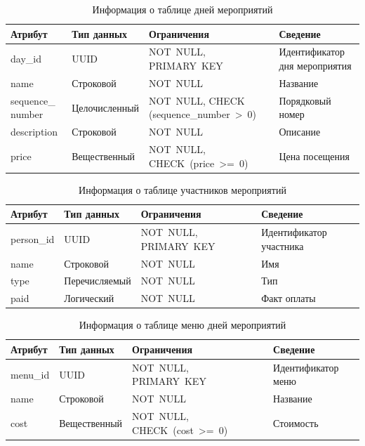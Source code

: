 \begin{table}[h!]
	\centering
	\caption{Информация о таблице дней мероприятий}
	\begin{tabularx}{\textwidth}{|p{2.6cm}|X|p{6cm}|X|}
		\hline
		\textbf{Атрибут} & \textbf{Тип данных} & \textbf{Ограничения} & \textbf{Сведение} \\
		\hline
		day\_id & UUID & NOT~NULL, \newline PRIMARY~KEY & Идентификатор дня мероприятия \\
		\hline
		name & Строковой & NOT~NULL & Название \\
		\hline
		sequence\_ number & Целочисленный & NOT~NULL, \newline CHECK (sequence\_number~>~0) & Порядковый номер \\
		\hline
		description & Строковой & NOT~NULL & Описание \\
		\hline
		price & Вещественный & NOT~NULL, \newline CHECK~(price~>=~0) & Цена посещения \\
		\hline
	\end{tabularx}
	\label{tbl:days}
\end{table}

\begin{table}[h!]
	\centering
	\caption{Информация о таблице участников мероприятий}
	\begin{tabularx}{\textwidth}{|p{2.6cm}|X|p{6cm}|X|}
		\hline
		\textbf{Атрибут} & \textbf{Тип данных} & \textbf{Ограничения} & \textbf{Сведение} \\
		\hline
		person\_id & UUID & NOT~NULL, \newline PRIMARY~KEY & Идентификатор участника \\
		\hline
		name & Строковой & NOT~NULL & Имя \\
		\hline
		type & Перечисляемый & NOT~NULL & Тип \\
		\hline
		paid & Логический & NOT~NULL & Факт оплаты \\
		\hline
	\end{tabularx}
	\label{tbl:persons}
\end{table}

\begin{table}[h!]
	\centering
	\caption{Информация о таблице меню дней мероприятий}
	\begin{tabularx}{\textwidth}{|p{2.6cm}|X|p{6cm}|X|}
		\hline
		\textbf{Атрибут} & \textbf{Тип данных} & \textbf{Ограничения} & \textbf{Сведение} \\
		\hline
		menu\_id & UUID & NOT~NULL, \newline PRIMARY~KEY & Идентификатор меню \\
		\hline
		name & Строковой & NOT~NULL & Название \\
		\hline
		cost & Вещественный & NOT~NULL, \newline CHECK~(cost~>=~0) & Стоимость \\
		\hline
	\end{tabularx}
	\label{tbl:menu}
\end{table}

